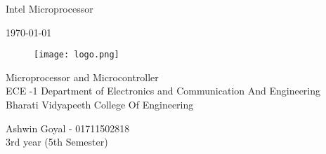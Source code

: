 \begin{titlepage}

\begin{center}

\Huge{Intel Microprocessor}
\vspace{10mm}

\normalsize{\today}


\vspace{10mm}


\begin{figure}[!h]
    \centering
    \texttt{[image: logo.png]}
\end{figure}

\vspace{5mm}

\small{Microprocessor and Microcontroller\\ ECE -1}
\vspace{5mm}
\small{Department of Electronics and Communication And Engineering\\ Bharati Vidyapeeth College Of Engineering\\ }

\vspace{5mm}

\small{Ashwin Goyal - 01711502818} \\
	\small{3rd year (5th Semester)} \\


\end{center}

\end{titlepage}
